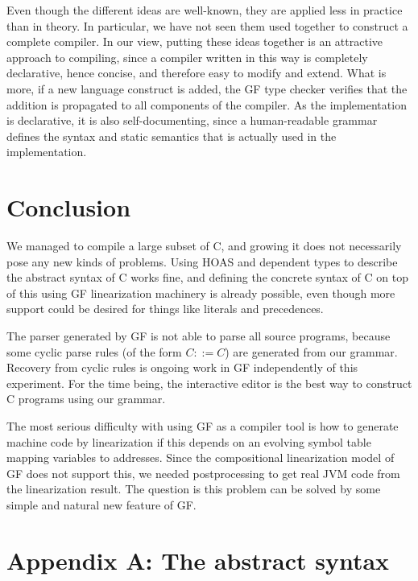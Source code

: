 \documentclass[12pt]{article}
\begin{document}
Even though the different ideas are well-known, they are
applied less in practice than in theory. In particular,
we have not seen them used together to construct a complete
compiler. In our view, putting these ideas together is
an attractive approach to compiling, since a compiler written
in this way is completely declarative, hence concise, 
and therefore easy to modify and extend. What is more, if
a new language construct is added, the GF type checker
verifies that the addition is propagated to all components
of the compiler. As the implementation is declarative, 
it is also self-documenting, since a human-readable 
grammar defines the syntax and static
semantics that is actually used in the implementation.


\section{Conclusion}

We managed to compile a large subset of C, and growing it
does not necessarily pose any new kinds of problems. 
Using HOAS and dependent types to describe the abstract
syntax of C works fine, and defining the concrete syntax
of C on top of this using GF linearization machinery is 
already possible, even though more support could be
desired for things like literals and precedences.

The parser generated by GF is not able to parse all
source programs, because some cyclic parse
rules (of the form $C ::= C$) are generated from our grammar. 
Recovery from cyclic rules is ongoing work in GF independently of this
experiment. 
For the time being, the interactive editor is the best way to
construct C programs using our grammar.

The most serious difficulty with using GF as a compiler tool
is how to generate machine code by linearization if this depends on
an evolving symbol table mapping variables to addresses.
Since the compositional linearization model of GF does not
support this, we needed postprocessing to get real JVM code
from the linearization result. The question is this problem can
be solved by some simple and natural new feature of GF.








\newpage
\section*{Appendix A: The abstract syntax}
\end{document}
